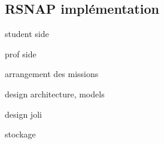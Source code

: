 \subsection{RSNAP implémentation}
student side

prof side

arrangement des missions

design architecture, models

design joli

stockage
